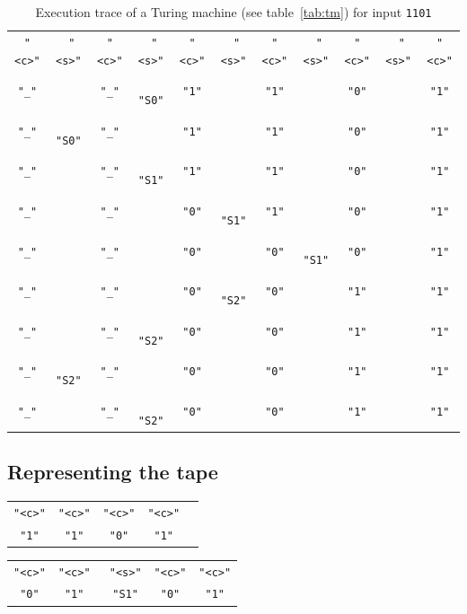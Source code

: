 \documentclass[11pt]{article}
\def\t#1{\texttt{#1}}
\def\h#1{{\tt \color{gray} #1}}
\begin{document}
\begin{table}[h]
  \centering
  \begin{tabular}{ccccccccccc}
    \t{"<c>"}&\h{"<s>"}&\t{"<c>"}&\h{"<s>"}&\t{"<c>"}&\h{"<s>"}&\t{"<c>"}&\h{"<s>"}&\t{"<c>"}&\h{"<s>"}&\t{"<c>"}\\
    \t{"\_"}&        &\t{"\_"}&\h{"S0"}&\t{"1"}&        &\t{"1"}&        &\t{"0"}&                   &\t{"1"}\\
    \t{"\_"}&\h{"S0"}&\t{"\_"}&        &\t{"1"}&        &\t{"1"}&        &\t{"0"}&                   &\t{"1"}\\
    \t{"\_"}&        &\t{"\_"}&\h{"S1"}&\t{"1"}&        &\t{"1"}&        &\t{"0"}&                   &\t{"1"}\\
    \t{"\_"}&        &\t{"\_"}&        &\t{"0"}&\h{"S1"}&\t{"1"}&        &\t{"0"}&                   &\t{"1"}\\
    \t{"\_"}&        &\t{"\_"}&        &\t{"0"}&        &\t{"0"}&\h{"S1"}&\t{"0"}&\hphantom{\t{"S1"}}&\t{"1"}\\
    \t{"\_"}&        &\t{"\_"}&        &\t{"0"}&\h{"S2"}&\t{"0"}&        &\t{"1"}&                   &\t{"1"}\\
    \t{"\_"}&        &\t{"\_"}&\h{"S2"}&\t{"0"}&        &\t{"0"}&        &\t{"1"}&                   &\t{"1"}\\
    \t{"\_"}&\h{"S2"}&\t{"\_"}&        &\t{"0"}&        &\t{"0"}&        &\t{"1"}&                   &\t{"1"}\\
    \t{"\_"}&        &\t{"\_"}&\h{"S2"}&\t{"0"}&        &\t{"0"}&        &\t{"1"}&                   &\t{"1"}
  \end{tabular}
  \caption{Execution trace of a Turing machine (see table~\ref{tab:tm}) for input \t{1101}}
  \label{tab:tmtrace}
\end{table}

\subsection{Representing the tape}

\begin{center}
  \renewcommand{\tabcolsep}{2.5pt}
  \begin{tabular}{ccccc}
    \t{"<c>"} & \t{"<c>"} & \t{"<c>"} & \t{"<c>"} \\
    \t{"1"}   & \t{"1"}   & \t{"0"}   & \t{"1"}  
  \end{tabular}
\end{center}

\begin{center}
  \renewcommand{\tabcolsep}{2.5pt}
  \begin{tabular}{ccccc}
    \t{"<c>"} & \t{"<c>"} & \h{"<s>"} & \t{"<c>"} & \t{"<c>"} \\
    \t{"0"}   & \t{"1"}   & \h{"S1"}  & \t{"0"}   & \t{"1"}
  \end{tabular}
\end{center}
\end{document}
